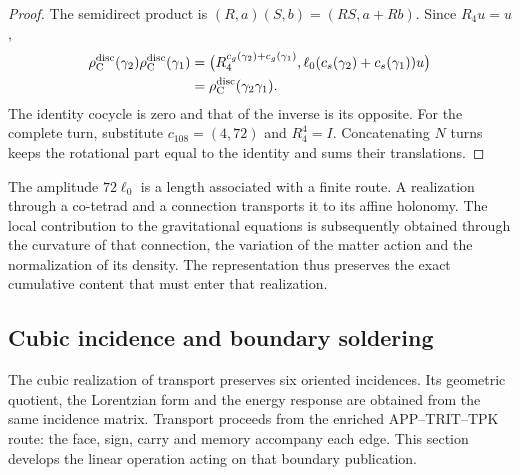 \begin{proof}
The semidirect product is
\((R,a)(S,b)=(RS,a+Rb)\). Since \(R_4u=u\),
\[
\begin{split}
 \rho_{\rm C}^{\rm disc}(\gamma_2)
 \rho_{\rm C}^{\rm disc}(\gamma_1)
 &=
 \bigl(R_4^{c_g(\gamma_2)+c_g(\gamma_1)},
 \ell_0(c_s(\gamma_2)+c_s(\gamma_1))u\bigr)\\
 &=\rho_{\rm C}^{\rm disc}(\gamma_2\gamma_1).
\end{split}
\]
The identity cocycle is zero and that of the inverse is its opposite.
For the complete turn, substitute \(c_{108}=(4,72)\) and
\(R_4^4=I\). Concatenating \(N\) turns keeps the rotational part
equal to the identity and sums their translations.
\end{proof}

The amplitude \(72\ell_0\) is a length associated with a finite route.
A realization through a co-tetrad and a connection transports it to its
affine holonomy. The local contribution to the gravitational equations
is subsequently obtained through the curvature of that connection, the
variation of the matter action and the normalization of its density.
The representation thus preserves the exact cumulative content that
must enter that realization.




\subsection{Cubic incidence and boundary soldering}
\label{ii:vii:sec:pantalla-respuesta}

The cubic realization of transport preserves six oriented incidences.
Its geometric quotient, the Lorentzian form and the energy response
are obtained from the same incidence matrix. Transport proceeds from
the enriched APP--TRIT--TPK route: the face, sign, carry and
memory accompany each edge. This section develops the
linear operation acting on that boundary publication.

